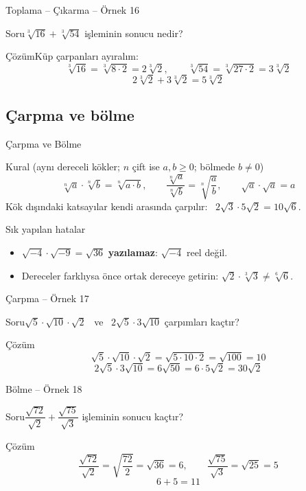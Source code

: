 \documentclass[aspectratio=169,11pt,handout]{beamer}
\newcommand{\soru}[3]{%
\begin{frame}{#1}
  \begin{block}{Soru}\large #2\end{block}
  \pause
  \begin{exampleblock}{Çözüm}\large #3\end{exampleblock}
\end{frame}}
\begin{document}
\soru{Toplama -- Çıkarma -- Örnek 16}
{\(\sqrt[3]{16}+\sqrt[3]{54}\) işleminin sonucu nedir?}
{Küp çarpanları ayıralım:
\[\sqrt[3]{16}=\sqrt[3]{8\cdot 2}=2\sqrt[3]{2},\qquad \sqrt[3]{54}=\sqrt[3]{27\cdot 2}=3\sqrt[3]{2}\]
\[2\sqrt[3]{2}+3\sqrt[3]{2}=5\sqrt[3]{2}\]}

\subsection{Çarpma ve bölme}
\begin{frame}{Çarpma ve Bölme}
\begin{block}{Kural (aynı dereceli kökler; \(n\) çift ise \(a,b\ge 0\); bölmede \(b\neq 0\))}
\[\sqrt[n]{a}\cdot\sqrt[n]{b}=\sqrt[n]{a\cdot b},\qquad \frac{\sqrt[n]{a}}{\sqrt[n]{b}}=\sqrt[n]{\frac{a}{b}},\qquad \sqrt{a}\cdot\sqrt{a}=a\]
Kök dışındaki katsayılar kendi arasında çarpılır: \ \(2\sqrt3\cdot 5\sqrt2=10\sqrt6\).
\end{block}
\begin{alertblock}{Sık yapılan hatalar}
\begin{itemize}
\item \(\sqrt{-4}\cdot\sqrt{-9}=\sqrt{36}\) \textbf{yazılamaz}: \(\sqrt{-4}\) reel değil.
\item Dereceler farklıysa önce ortak dereceye getirin: \(\sqrt2\cdot\sqrt[3]{3}\neq\sqrt[6]{6}\).
\end{itemize}
\end{alertblock}
\end{frame}

\soru{Çarpma -- Örnek 17}
{\(\sqrt5\cdot\sqrt{10}\cdot\sqrt2\) \ ve \ \(2\sqrt5\cdot 3\sqrt{10}\) çarpımları kaçtır?}
{\[\sqrt5\cdot\sqrt{10}\cdot\sqrt2=\sqrt{5\cdot 10\cdot 2}=\sqrt{100}=10\]
\[2\sqrt5\cdot 3\sqrt{10}=6\sqrt{50}=6\cdot 5\sqrt2=30\sqrt2\]}

\soru{Bölme -- Örnek 18}
{\(\dfrac{\sqrt{72}}{\sqrt2}+\dfrac{\sqrt{75}}{\sqrt3}\) işleminin sonucu kaçtır?}
{\[\frac{\sqrt{72}}{\sqrt2}=\sqrt{\frac{72}{2}}=\sqrt{36}=6,\qquad \frac{\sqrt{75}}{\sqrt3}=\sqrt{25}=5\]
\[6+5=11\]}
\end{document}
